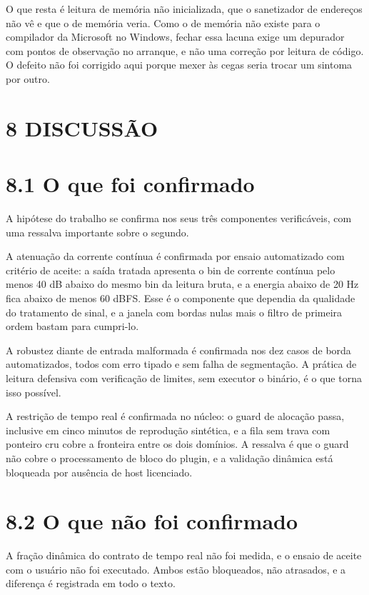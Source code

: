 \documentclass[12pt,a4paper]{article}
\begin{document}
O que resta é leitura de memória não inicializada, que o sanetizador de endereços não vê e que o de memória veria. Como o de memória não existe para o compilador da Microsoft no Windows, fechar essa lacuna exige um depurador com pontos de observação no arranque, e não uma correção por leitura de código. O defeito não foi corrigido aqui porque mexer às cegas seria trocar um sintoma por outro.


\section*{8 DISCUSSÃO}

\section*{8.1 O que foi confirmado}

A hipótese do trabalho se confirma nos seus três componentes verificáveis, com uma ressalva importante sobre o segundo.


A atenuação da corrente contínua é confirmada por ensaio automatizado com critério de aceite: a saída tratada apresenta o bin de corrente contínua pelo menos 40 dB abaixo do mesmo bin da leitura bruta, e a energia abaixo de 20 Hz fica abaixo de menos 60 dBFS. Esse é o componente que dependia da qualidade do tratamento de sinal, e a janela com bordas nulas mais o filtro de primeira ordem bastam para cumpri-lo.


A robustez diante de entrada malformada é confirmada nos dez casos de borda automatizados, todos com erro tipado e sem falha de segmentação. A prática de leitura defensiva com verificação de limites, sem executor o binário, é o que torna isso possível.


A restrição de tempo real é confirmada no núcleo: o guard de alocação passa, inclusive em cinco minutos de reprodução sintética, e a fila sem trava com ponteiro cru cobre a fronteira entre os dois domínios. A ressalva é que o guard não cobre o processamento de bloco do plugin, e a validação dinâmica está bloqueada por ausência de host licenciado.


\section*{8.2 O que não foi confirmado}

A fração dinâmica do contrato de tempo real não foi medida, e o ensaio de aceite com o usuário não foi executado. Ambos estão bloqueados, não atrasados, e a diferença é registrada em todo o texto.
\end{document}
